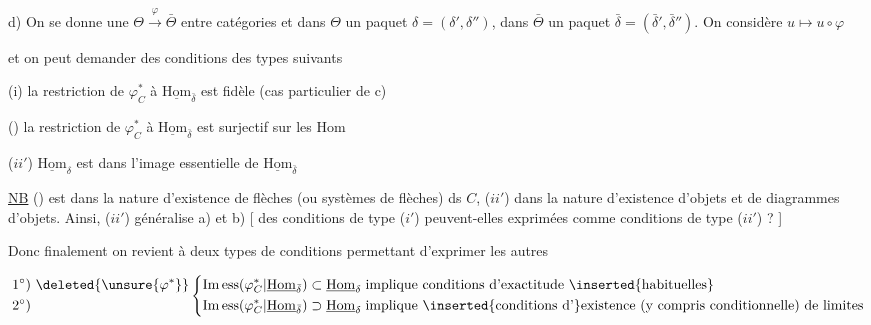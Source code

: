 d) On se donne une  $\Theta\xrightarrow{\varphi}\bar\Theta$ entre catégories et dans $\Theta$ un paquet $\delta=(\delta',\delta'')$, dans $\bar\Theta$ un paquet $\bar\delta=(\bar\delta',\bar\delta'')$. On considère $u\longmapsto u\circ\varphi$



et on peut demander des conditions des types suivants

(i) la restriction de $\varphi^*_C$ à $\underline{\mathrm{Hom}}_{\bar\delta}$ est fidèle (cas particulier de c)

() la restriction de $\varphi^*_C$ à $\underline{\mathrm{Hom}}_{\bar\delta}$ est  surjectif sur les Hom


($ii'$) $\underline{\mathrm{Hom}}_\delta$ est dans l'image essentielle de $\underline{\mathrm{Hom}}_{\bar\delta}$

\uline{NB} ()  est dans la nature  d'existence de flèches (ou systèmes de flèches) ds $C$,  ($ii'$) dans la nature d'existence d'objets et de diagrammes d'objets. Ainsi, ($ii'$) généralise a) et b) [  des conditions de type ($i'$) peuvent-elles  exprimées comme conditions de type ($ii'$) ? ]


Donc finalement on revient à deux types de conditions permettant d'exprimer les autres

\[
\begin{aligned}1^\circ)&\ \deleted{\unsure{\varphi^*}}\\2^\circ)&\end{aligned}
\left\{\begin{aligned}
&\mathrm{Im\,ess}(\varphi^*_C\vert\underline{\mathrm{Hom}}_{\bar\delta})\subset\underline{\mathrm{Hom}}_\delta\\
&\mathrm{Im\,ess}(\varphi^*_C\vert\underline{\mathrm{Hom}}_{\bar\delta})\supset\underline{\mathrm{Hom}}_\delta
\end{aligned}\right.
\begin{aligned}
&\text{implique conditions d'exactitude }\inserted{\text{habituelles}}\\
&\text{implique }\inserted{\text{conditions d'}}\text{existence (y compris conditionnelle) de limites}
\end{aligned}
\]

